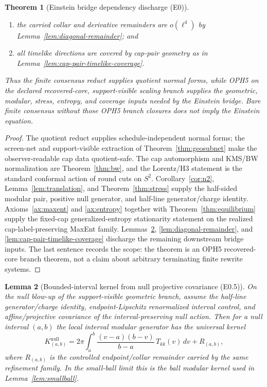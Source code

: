 \documentclass[11pt]{article}
\newtheorem{theorem}{Theorem}[section]
\newtheorem{lemma}[theorem]{Lemma}
\begin{document}
\begin{theorem}[Einstein bridge dependency discharge (E0)]
\begin{enumerate}[leftmargin=2em,label=(\roman*)]
after the geometry readout has been discharged;
\item the carried collar and derivative remainders are \(o(\ell^4)\) by
Lemma~\ref{lem:diagonal-remainder}; and
\item all timelike directions are covered by cap-pair geometry as in
Lemma~\ref{lem:cap-pair-timelike-coverage}.
\end{enumerate}
Thus the finite consensus reduct supplies quotient normal forms, while OPH5 on
the declared recovered-core, support-visible scaling branch supplies the
geometric, modular, stress, entropy, and coverage inputs needed by the Einstein
bridge.  Bare finite consensus without those OPH5 branch closures does not
imply the Einstein equation.
\end{theorem}

\begin{proof}
The quotient reduct supplies schedule-independent normal forms; the screen-net
and support-visible extraction of Theorem~\ref{thm:geosubnet} make the
observer-readable cap data quotient-safe.  The cap automorphism and KMS/BW
normalization are Theorem~\ref{thm:bw}, and the Lorentz/H3 statement is the
standard conformal action of round cuts on \(S^2\).  Corollary~\ref{cor:n2},
Lemma~\ref{lem:translation}, and Theorem~\ref{thm:stress} supply the
half-sided modular pair, positive null generator, and half-line
generator/charge identity.  Axioms~\ref{ax:maxent} and \ref{ax:entropy}
together with Theorem~\ref{thm:equilibrium} supply the fixed-cap
generalized-entropy stationarity statement on the realized
cap-label-preserving MaxEnt family.  Lemmas~\ref{lem:bounded-interval-kernel},
\ref{lem:diagonal-remainder}, and \ref{lem:cap-pair-timelike-coverage}
discharge the remaining downstream bridge inputs.  The last sentence records
the scope: the theorem is an OPH5 recovered-core branch theorem, not a claim
about arbitrary terminating finite rewrite systems.
\end{proof}

\begin{lemma}[Bounded-interval kernel from null projective covariance (E0.5)]\label{lem:bounded-interval-kernel}
On the null blow-up of the support-visible geometric branch, assume the
half-line generator/charge identity, endpoint-Lipschitz renormalized interval
control, and affine/projective covariance of the interval-preserving null
action.  Then for a null interval \((a,b)\) the local interval modular
generator has the universal kernel
\[
K_{(a,b)}^{\mathrm{null}}
=2\pi\int_a^b \frac{(v-a)(b-v)}{b-a}\,T_{kk}(v)\,dv
+R_{(a,b)},
\]
where \(R_{(a,b)}\) is the controlled endpoint/collar remainder carried by the
same refinement family.  In the small-ball limit this is the ball modular
kernel used in Lemma~\ref{lem:smallball}.
\end{lemma}
\end{document}
